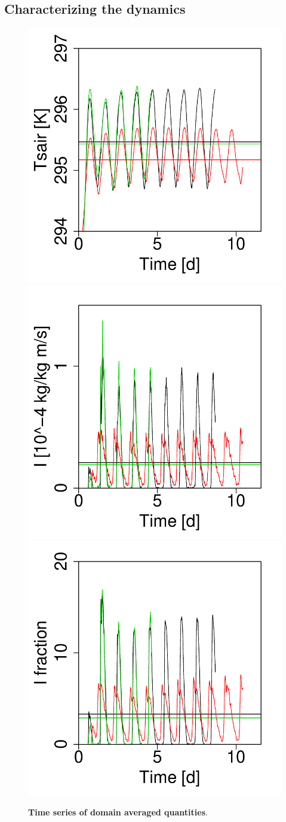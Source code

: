 \documentclass[draft,linenumbers]{agujournal2019}
\begin{document}
\subsection{Characterizing the dynamics}


\begin{figure}
\centering
\includegraphics[trim={0 0 0cm 0}, clip, height=0.32\linewidth]{tsair_timeseries.pdf}
\includegraphics[trim={0 0 0cm 0}, clip, height=0.32\linewidth]{prcp_timeseries.pdf}
\includegraphics[trim={0 0 0cm 0}, clip, height=0.32\linewidth]{pfrac_timeseries.pdf}
\caption{{\bf Time series of domain averaged quantities}. }
\label{fig:domain_mean_timeseries}
\end{figure}
\end{document}
